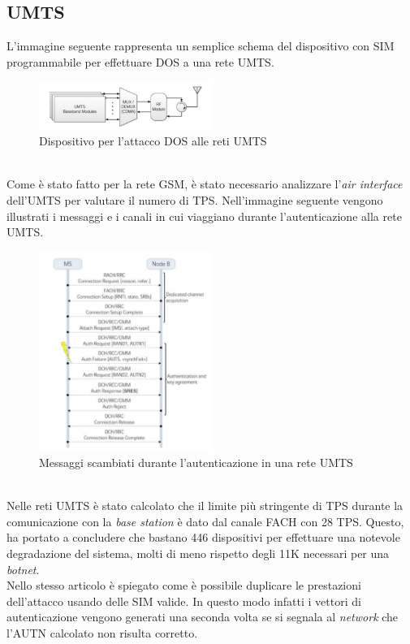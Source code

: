\clearpage

\subsection{UMTS}
L'immagine seguente rappresenta un semplice schema del dispositivo con SIM programmabile per effettuare DOS a una rete UMTS\cite{umts-dos}.
\begin{figure}[h]
    \centering
    \includegraphics[width=0.5\textwidth]{images/umts-dos-device.png}
    \caption{Dispositivo per l'attacco DOS alle reti UMTS\cite{umts-dos}}
\end{figure}\\
Come è stato fatto per la rete GSM, è stato necessario analizzare l'\textit{air interface} dell'UMTS per valutare il numero di TPS.
Nell'immagine seguente vengono illustrati i messaggi e i canali in cui viaggiano durante l'autenticazione alla rete UMTS.
\begin{figure}[h]
    \centering
    \includegraphics[width=0.5\textwidth]{images/umts-air-channel.png}
    \caption{Messaggi scambiati durante l'autenticazione in una rete UMTS\cite{umts-dos}}
\end{figure}\\
Nelle reti UMTS è stato calcolato che il limite più stringente di TPS durante la comunicazione con la \textit{base station} è dato dal canale FACH con 28 TPS.
Questo, ha portato a concludere che bastano 446 dispositivi per effettuare una notevole degradazione del sistema, molti di meno rispetto degli 11K necessari per una \textit{botnet}\cite{dos-imsi}.\\
Nello stesso articolo è spiegato come è possibile duplicare le prestazioni dell'attacco usando delle SIM valide. In questo modo infatti i vettori di autenticazione vengono generati una seconda volta se si segnala al
\textit{network} che l'AUTN calcolato non risulta corretto.
